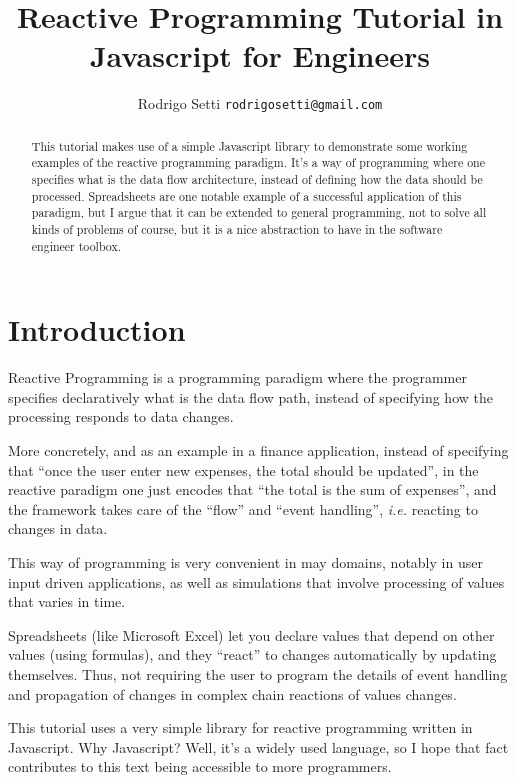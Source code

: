 \documentclass[notitlepage]{article}
\begin{document}
\lstset{language=matlab}

\title{Reactive Programming Tutorial in Javascript for Engineers}
\author{Rodrigo Setti \texttt{rodrigosetti@gmail.com}}

\maketitle

\begin{abstract}
    This tutorial makes use of a simple Javascript library to demonstrate some
    working examples of the reactive programming paradigm. It's a way of
    programming where one specifies what is the data flow architecture, instead
    of defining how the data should be processed. Spreadsheets are one notable
    example of a successful application of this paradigm, but I argue that it
    can be extended to general programming, not to solve all kinds of problems
    of course, but it is a nice abstraction to have in the software engineer
    toolbox.
\end{abstract}

\section{Introduction}

Reactive Programming is a programming paradigm where the programmer specifies
declaratively what is the data flow path, instead of specifying how the
processing responds to data changes.

More concretely, and as an example in a finance application, instead of
specifying that ``once the user enter new expenses, the total should be
updated'', in the reactive paradigm one just encodes that ``the total is the
sum of expenses'', and the framework takes care of the ``flow'' and ``event
handling'', \textit{i.e.} reacting to changes in data.

This way of programming is very convenient in may domains, notably in user
input driven applications, as well as simulations that involve processing of
values that varies in time.

Spreadsheets (like Microsoft Excel) let you declare values that depend on other
values (using formulas), and they ``react'' to changes automatically by
updating themselves. Thus, not requiring the user to program the details of
event handling and propagation of changes in complex chain reactions of values
changes.

This tutorial uses a very simple library for reactive programming written in
Javascript. Why Javascript? Well, it's a widely used language, so I hope that
fact contributes to this text being accessible to more programmers.
\end{document}
